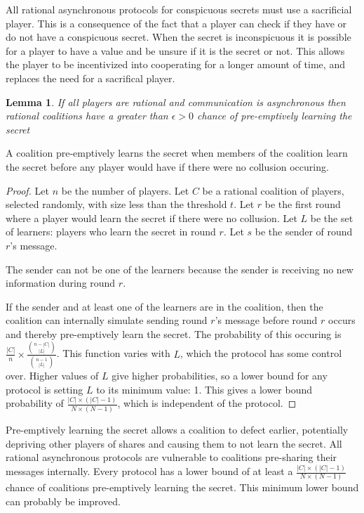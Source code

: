 \documentclass{dalcsthesis}
\newtheorem{lemma}{Lemma}
\begin{document}
All rational asynchronous protocols for conspicuous secrets must use a sacrificial player. This is a consequence of the fact that a player can check if they have or do not have a conspicuous secret. When the secret is inconspicuous it is possible for a player to have a value and be unsure if it is the secret or not. This allows the player to be incentivized into cooperating for a longer amount of time, and replaces the need for a sacrifical player.

\begin{lemma} If all players are rational and communication is asynchronous then rational coalitions have a greater than $\epsilon > 0$ chance of pre-emptively learning the secret \end{lemma}

A coalition pre-emptively learns the secret when members of the coalition learn the secret before any player would have if there were no collusion occuring.

\begin{proof}
Let $n$ be the number of players.
Let $C$ be a rational coalition of players, selected randomly, with size less than the threshold $t$.
Let $r$ be the first round where a player would learn the secret if there were no collusion.
Let $L$ be the set of learners: players who learn the secret in round $r$.
Let $s$ be the sender of round $r$'s message.

The sender can not be one of the learners because the sender is receiving no new information during round $r$.

If the sender and at least one of the learners are in the coalition, then the coalition can internally simulate sending round $r$'s message before round $r$ occurs and thereby pre-emptively learn the secret. The probability of this occuring is $\frac{|C|}{n} \times \frac{{n - |C| \choose |L|}}{{n - 1 \choose |L|}}$. This function varies with $L$, which the protocol has some control over. Higher values of $L$ give higher probabilities, so a lower bound for any protocol is setting $L$ to its minimum value: 1. This gives a lower bound probability of $\frac{|C| \times (|C| - 1)}{N \times (N-1)}$, which is independent of the protocol.
\end{proof}

Pre-emptively learning the secret allows a coalition to defect earlier, potentially depriving other players of shares and causing them to not learn the secret. All rational asynchronous protocols are vulnerable to coalitions pre-sharing their messages internally. Every protocol has a lower bound of at least a $\frac{|C| \times (|C| - 1)}{N \times (N-1)}$ chance of coalitions pre-emptively learning the secret. This minimum lower bound can probably be improved.
\end{document}
